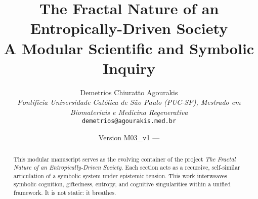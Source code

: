\documentclass[12pt]{article}
\title{\textbf{The Fractal Nature of an Entropically-Driven Society} \\ \large A Modular Scientific and Symbolic Inquiry}
\author{
Demetrios Chiuratto Agourakis\\
\textit{Pontifícia Universidade Católica de São Paulo (PUC-SP), Mestrado em Biomateriais e Medicina Regenerativa}\\
\texttt{demetrios@agourakis.med.br}
}
\date{Version M03\_v1 — \DTMnow}
\begin{document}
\maketitle


\begin{abstract}
This modular manuscript serves as the evolving container of the project \textit{The Fractal Nature of an Entropically-Driven Society}. Each section acts as a recursive, self-similar articulation of a symbolic system under epistemic tension. This work interweaves symbolic cognition, giftedness, entropy, and cognitive singularities within a unified framework. It is not static: it breathes.
\end{abstract}

\tableofcontents
\newpage




% 
% 
% 
% 



\end{document}
